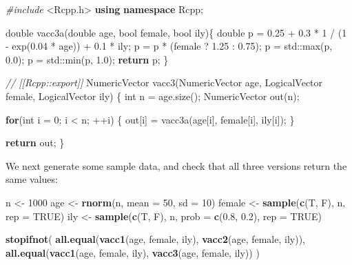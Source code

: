 \documentclass[]{book}
\newenvironment{Shaded}{\begin{snugshade}}{\end{snugshade}}
\newcommand{\BuiltInTok}[1]{#1}
\newcommand{\CommentTok}[1]{\textcolor[rgb]{0.37,0.37,0.37}{\textit{#1}}}
\newcommand{\ControlFlowTok}[1]{\textcolor[rgb]{0.27,0.27,0.27}{\textbf{#1}}}
\newcommand{\DataTypeTok}[1]{\textcolor[rgb]{0.27,0.27,0.27}{#1}}
\newcommand{\DecValTok}[1]{\textcolor[rgb]{0.06,0.06,0.06}{#1}}
\newcommand{\FloatTok}[1]{\textcolor[rgb]{0.06,0.06,0.06}{#1}}
\newcommand{\ImportTok}[1]{#1}
\newcommand{\KeywordTok}[1]{\textcolor[rgb]{0.27,0.27,0.27}{\textbf{#1}}}
\newcommand{\NormalTok}[1]{#1}
\newcommand{\OtherTok}[1]{\textcolor[rgb]{0.37,0.37,0.37}{#1}}
\newcommand{\PreprocessorTok}[1]{\textcolor[rgb]{0.37,0.37,0.37}{\textit{#1}}}
\newcommand{\StringTok}[1]{\textcolor[rgb]{0.5,0.5,0.5}{#1}}
\begin{document}
\begin{Shaded}
\begin{Highlighting}[]
\PreprocessorTok{#include }\ImportTok{<Rcpp.h>}
\KeywordTok{using} \KeywordTok{namespace}\NormalTok{ Rcpp;}

\DataTypeTok{double}\NormalTok{ vacc3a(}\DataTypeTok{double}\NormalTok{ age, }\DataTypeTok{bool}\NormalTok{ female, }\DataTypeTok{bool}\NormalTok{ ily)\{}
  \DataTypeTok{double}\NormalTok{ p = }\FloatTok{0.25}\NormalTok{ + }\FloatTok{0.3}\NormalTok{ * }\DecValTok{1}\NormalTok{ / (}\DecValTok{1}\NormalTok{ - exp(}\FloatTok{0.04}\NormalTok{ * age)) + }\FloatTok{0.1}\NormalTok{ * ily;}
\NormalTok{  p = p * (female ? }\FloatTok{1.25}\NormalTok{ : }\FloatTok{0.75}\NormalTok{);}
\NormalTok{  p = }\BuiltInTok{std::}\NormalTok{max(p, }\FloatTok{0.0}\NormalTok{);}
\NormalTok{  p = }\BuiltInTok{std::}\NormalTok{min(p, }\FloatTok{1.0}\NormalTok{);}
  \ControlFlowTok{return}\NormalTok{ p;}
\NormalTok{\}}

\CommentTok{// [[Rcpp::export]]}
\NormalTok{NumericVector vacc3(NumericVector age, LogicalVector female, }
\NormalTok{                    LogicalVector ily) \{}
  \DataTypeTok{int}\NormalTok{ n = age.size();}
\NormalTok{  NumericVector out(n);}

  \ControlFlowTok{for}\NormalTok{(}\DataTypeTok{int}\NormalTok{ i = }\DecValTok{0}\NormalTok{; i < n; ++i) \{}
\NormalTok{    out[i] = vacc3a(age[i], female[i], ily[i]);}
\NormalTok{  \}}

  \ControlFlowTok{return}\NormalTok{ out;}
\NormalTok{\}}
\end{Highlighting}
\end{Shaded}

We next generate some sample data, and check that all three versions return the same values:

\begin{Shaded}
\begin{Highlighting}[]
\NormalTok{n <-}\StringTok{ }\DecValTok{1000}
\NormalTok{age <-}\StringTok{ }\KeywordTok{rnorm}\NormalTok{(n, }\DataTypeTok{mean =} \DecValTok{50}\NormalTok{, }\DataTypeTok{sd =} \DecValTok{10}\NormalTok{)}
\NormalTok{female <-}\StringTok{ }\KeywordTok{sample}\NormalTok{(}\KeywordTok{c}\NormalTok{(T, F), n, }\DataTypeTok{rep =} \OtherTok{TRUE}\NormalTok{)}
\NormalTok{ily <-}\StringTok{ }\KeywordTok{sample}\NormalTok{(}\KeywordTok{c}\NormalTok{(T, F), n, }\DataTypeTok{prob =} \KeywordTok{c}\NormalTok{(}\FloatTok{0.8}\NormalTok{, }\FloatTok{0.2}\NormalTok{), }\DataTypeTok{rep =} \OtherTok{TRUE}\NormalTok{)}

\KeywordTok{stopifnot}\NormalTok{(}
  \KeywordTok{all.equal}\NormalTok{(}\KeywordTok{vacc1}\NormalTok{(age, female, ily), }\KeywordTok{vacc2}\NormalTok{(age, female, ily)),}
  \KeywordTok{all.equal}\NormalTok{(}\KeywordTok{vacc1}\NormalTok{(age, female, ily), }\KeywordTok{vacc3}\NormalTok{(age, female, ily))}
\NormalTok{)}
\end{Highlighting}
\end{Shaded}
\end{document}
